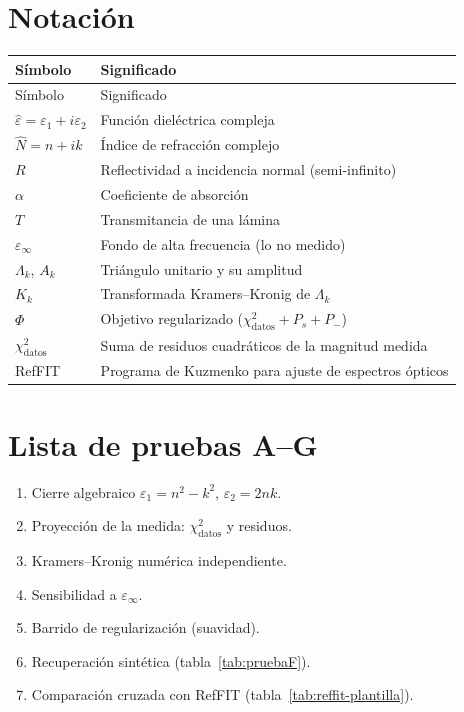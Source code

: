 \chapter{Notaci\'on}
\label{ap:notacion}

\begin{longtable}{@{}lp{10.2cm}@{}}
\toprule
S\'imbolo & Significado \\
\midrule
\endfirsthead
\toprule
S\'imbolo & Significado \\
\midrule
\endhead
$\hat\varepsilon=\varepsilon_1+i\varepsilon_2$ & Funci\'on diel\'ectrica compleja \\
$\hat N=n+ik$ & \'Indice de refracci\'on complejo \\
$R$ & Reflectividad a incidencia normal (semi-infinito) \\
$\alpha$ & Coeficiente de absorci\'on \\
$T$ & Transmitancia de una l\'amina \\
$\varepsilon_\infty$ & Fondo de alta frecuencia (lo no medido) \\
$\Lambda_k$, $A_k$ & Tri\'angulo unitario y su amplitud \\
$K_k$ & Transformada Kramers--Kronig de $\Lambda_k$ \\
$\Phi$ & Objetivo regularizado ($\chi^{2}_{\mathrm{datos}}+P_s+P_-$) \\
$\chi^{2}_{\mathrm{datos}}$ & Suma de residuos cuadr\'aticos de la magnitud medida \\
RefFIT & Programa de Kuzmenko para ajuste de espectros \'opticos \\
\bottomrule
\end{longtable}

\chapter{Lista de pruebas A--G}
\label{ap:pruebas}

\begin{enumerate}[leftmargin=*]
\item[A.] Cierre algebraico $\varepsilon_1=n^{2}-k^{2}$, $\varepsilon_2=2nk$.
\item[B.] Proyecci\'on de la medida: $\chi^{2}_{\mathrm{datos}}$ y residuos.
\item[C.] Kramers--Kronig num\'erica independiente.
\item[D.] Sensibilidad a $\varepsilon_\infty$.
\item[E.] Barrido de regularizaci\'on (suavidad).
\item[F.] Recuperaci\'on sint\'etica (tabla~\ref{tab:pruebaF}).
\item[G.] Comparaci\'on cruzada con RefFIT (tabla~\ref{tab:reffit-plantilla}).
\end{enumerate}

